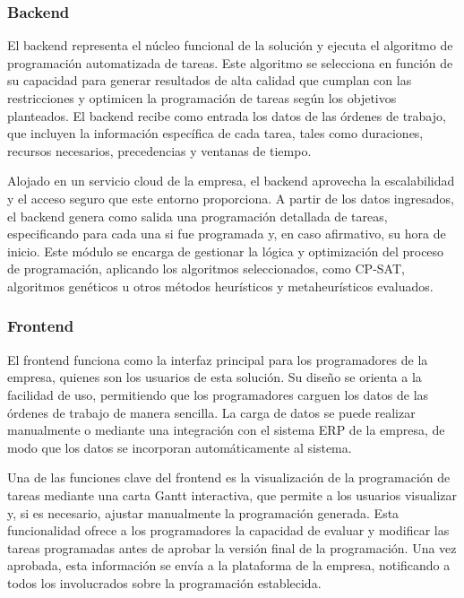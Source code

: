 \documentclass{article}
\begin{document}
\subsubsection{Backend}

El backend representa el núcleo funcional de la solución y ejecuta el algoritmo de programación automatizada de tareas. Este algoritmo se selecciona en función de su capacidad para generar resultados de alta calidad que cumplan con las restricciones y optimicen la programación de tareas según los objetivos planteados. El backend recibe como entrada los datos de las órdenes de trabajo, que incluyen la información específica de cada tarea, tales como duraciones, recursos necesarios, precedencias y ventanas de tiempo.

Alojado en un servicio cloud de la empresa, el backend aprovecha la escalabilidad y el acceso seguro que este entorno proporciona. A partir de los datos ingresados, el backend genera como salida una programación detallada de tareas, especificando para cada una si fue programada y, en caso afirmativo, su hora de inicio. Este módulo se encarga de gestionar la lógica y optimización del proceso de programación, aplicando los algoritmos seleccionados, como CP-SAT, algoritmos genéticos u otros métodos heurísticos y metaheurísticos evaluados.

\subsubsection{Frontend}

El frontend funciona como la interfaz principal para los programadores de la empresa, quienes son los usuarios de esta solución. Su diseño se orienta a la facilidad de uso, permitiendo que los programadores carguen los datos de las órdenes de trabajo de manera sencilla. La carga de datos se puede realizar manualmente o mediante una integración con el sistema ERP de la empresa, de modo que los datos se incorporan automáticamente al sistema.

Una de las funciones clave del frontend es la visualización de la programación de tareas mediante una carta Gantt interactiva, que permite a los usuarios visualizar y, si es necesario, ajustar manualmente la programación generada. Esta funcionalidad ofrece a los programadores la capacidad de evaluar y modificar las tareas programadas antes de aprobar la versión final de la programación. Una vez aprobada, esta información se envía a la plataforma de la empresa, notificando a todos los involucrados sobre la programación establecida.
\end{document}
